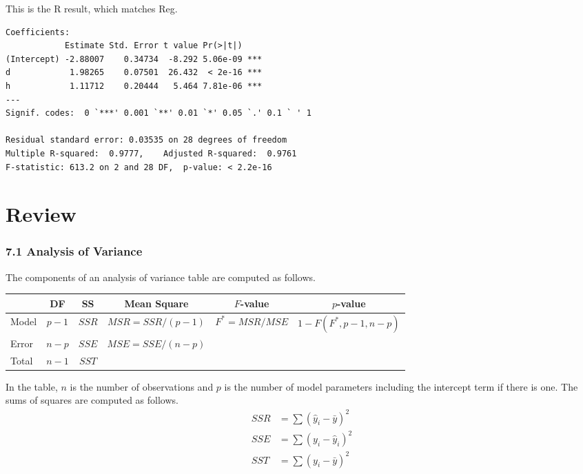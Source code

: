 \documentclass[12pt]{article}
\begin{document}
This is the R result, which matches Reg.

{\footnotesize\begin{verbatim}
Coefficients:
            Estimate Std. Error t value Pr(>|t|)    
(Intercept) -2.88007    0.34734  -8.292 5.06e-09 ***
d            1.98265    0.07501  26.432  < 2e-16 ***
h            1.11712    0.20444   5.464 7.81e-06 ***
---
Signif. codes:  0 `***' 0.001 `**' 0.01 `*' 0.05 `.' 0.1 ` ' 1

Residual standard error: 0.03535 on 28 degrees of freedom
Multiple R-squared:  0.9777,	Adjusted R-squared:  0.9761 
F-statistic: 613.2 on 2 and 28 DF,  p-value: < 2.2e-16
\end{verbatim}}

\newpage

\section{Review}

\subsubsection*{7.1 Analysis of Variance}

The components of an analysis of variance table are computed as follows.

{\footnotesize\begin{center}\begin{tabular}{|l|c|c|c|c|c|}
\hline
& DF & SS & Mean Square & $F$-value & $p$-value\\
\hline
Model
& $p-1$
& $SSR$
& $MSR=SSR/(p-1)$
& $F^*=MSR/MSE$
& $1-F(F^*,p-1,n-p)$\\
Error
& $n-p$
& $SSE$
& $MSE=SSE/(n-p)$
& &\\
Total
& $n-1$
& $SST$
& & &\\
\hline
\end{tabular}\end{center}}

\bigskip

In the table, $n$ is the number of observations and $p$ is the
number of model parameters including the intercept term
if there is one.
The sums of squares are computed as follows.
\begin{align*}
SSR&=\sum(\hat y_i-\bar y)^2\\
SSE&=\sum(y_i-\hat y_i)^2\\
SST&=\sum(y_i-\bar y)^2
\end{align*}
\end{document}
